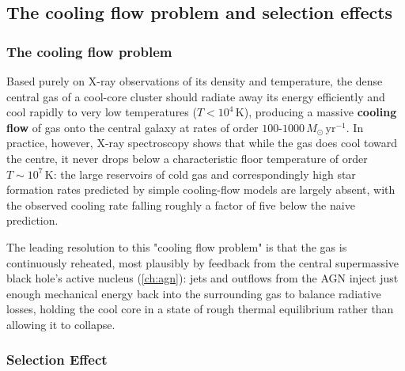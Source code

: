 \subsection{The cooling flow problem and selection effects} \label{subsec:cooling-flow-selection}

\subsubsection{The cooling flow problem}

Based purely on X-ray observations of its density and temperature, the dense central gas of a cool-core cluster should radiate away its energy efficiently and cool rapidly to very low temperatures ($T < 10^4\,\text{K}$), producing a massive \textbf{cooling flow} of gas onto the central galaxy at rates of order $100$-$1000\,M_\odot\,\text{yr}^{-1}$. In practice, however, X-ray spectroscopy shows that while the gas does cool toward the centre, it never drops below a characteristic floor temperature of order $T \sim 10^7\,\text{K}$: the large reservoirs of cold gas and correspondingly high star formation rates predicted by simple cooling-flow models are largely absent, with the observed cooling rate falling roughly a factor of five below the naive prediction.

\smallskip

The leading resolution to this "cooling flow problem" is that the gas is continuously reheated, most plausibly by feedback from the central supermassive black hole's active nucleus (\cref{ch:agn}): jets and outflows from the AGN inject just enough mechanical energy back into the surrounding gas to balance radiative losses, holding the cool core in a state of rough thermal equilibrium rather than allowing it to collapse.

\subsubsection{Selection Effect}

